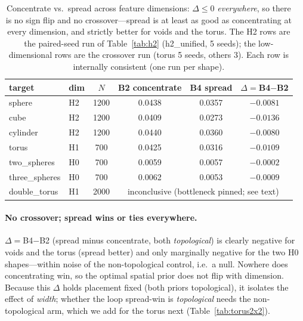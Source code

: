 \begin{table}[h]
\centering
\begin{tabular}{llcccc}
\toprule
target & dim & $N$ & B2 concentrate & B4 spread & $\Delta=$B4$-$B2 \\
\midrule
sphere         & H2 & 1200 & 0.0438 & 0.0357 & $-0.0081$ \\
cube           & H2 & 1200 & 0.0409 & 0.0273 & $-0.0136$ \\
cylinder       & H2 & 1200 & 0.0440 & 0.0360 & $-0.0080$ \\
torus          & H1 &  700 & 0.0425 & 0.0316 & $-0.0109$ \\
two\_spheres   & H0 &  700 & 0.0059 & 0.0057 & $-0.0002$ \\
three\_spheres & H0 &  700 & 0.0062 & 0.0053 & $-0.0009$ \\
double\_torus  & H1 & 2000 & \multicolumn{3}{c}{inconclusive (bottleneck pinned; see text)} \\
\bottomrule
\end{tabular}
\caption{Concentrate vs.\ spread across feature dimensions: $\Delta\le 0$
\emph{everywhere}, so there is no sign flip and no crossover---spread is at least as
good as concentrating at every dimension, and strictly better for voids and the
torus. The H2 rows are the paired-seed run of Table~\ref{tab:h2} (h2\_unified, 5
seeds); the low-dimensional rows are the crossover run (torus 5 seeds, others 3).
Each row is internally consistent (one run per shape).}
\label{tab:crossover}
\end{table}

\paragraph{No crossover; spread wins or ties everywhere.} $\Delta=$B4$-$B2 (spread
minus concentrate, both \emph{topological}) is clearly negative for voids and the torus
(spread better) and only marginally negative for the two H0 shapes---within noise of the
non-topological control, i.e.\ a null. Nowhere does concentrating win, so the optimal
spatial prior does not flip with dimension. Because this $\Delta$ holds placement fixed
(both priors topological), it isolates the effect of \emph{width}; whether the loop
spread-win is \emph{topological} needs the non-topological arm, which we add for the
torus next (Table~\ref{tab:torus2x2}).

